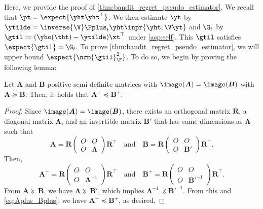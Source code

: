 Here, we provide the proof of \cref{thm:bandit_regret_pseudo_estimator}.
We recall that $\pt=\expect{\yht\yht^\top}$.
We then estimate $\yt$ by $\ytilde=\inverse{\V}\Pplus_t\yht\inpr{\yht,\V\yt}$
and $\G_t$ by $\gtil\coloneqq(\yho(\tht)-\ytilde)\xt^\top$ under \cref{asp:self}.
This $\gtil$ satisfies 
$
    \expect{\gtil}=\G_t. 
$
To prove \cref{thm:bandit_regret_pseudo_estimator}, we will upper bound $\expect{\nrm{\gtil}_\F^2}$.
To do so, we begin by proving the following lemma:
\begin{lemma}\label{lem:pseudo_inverse_order}
    Let $\bm{A}$ and $\bm{B}$ positive semi-definite matrices with $\image(\bm{A}) = \image(\bm{B})$ with $\bm{A} \succeq \bm{B}$.
    Then, it holds that $\bm{A}^+ \preceq \bm{B}^+$.
\end{lemma}
\begin{proof}
Since $\image(\bm{A}) = \image(\bm{B})$, there exists an orthogonal matrix $\bm{R}$, a diagonal matrix $\bm{\Lambda}$, and an invertible matrix $\bm{B}'$ that has same dimensions as $\bm{\Lambda}$ such that 
\begin{equation}
    \bm{A}
    =
    \bm{R}
    \begin{pmatrix}
        O & O \\
        O & \bm{\Lambda} 
    \end{pmatrix}
    \bm{R}^\top
    \quad 
    \mbox{and}
    \quad
    \bm{B}
    =
    \bm{R}
    \begin{pmatrix}
        O & O \\
        O & \bm{B}'
    \end{pmatrix}
    \bm{R}^\top
    .
    \nonumber
\end{equation}
Then, 
\begin{equation}\label{eq:Aplus_Bplus}
    \bm{A}^+
    =
    \bm{R}
    \begin{pmatrix}
        O & O \\
        O & \bm{\Lambda}^{-1}
    \end{pmatrix}
    \bm{R}^\top
    \quad 
    \mbox{and}
    \quad
    \bm{B}^+
    =
    \bm{R}
    \begin{pmatrix}
        O & O \\
        O & {\bm{B}'}^{-1}
    \end{pmatrix}
    \bm{R}^\top
    .
\end{equation}
From $\bm{A} \succeq \bm{B}$,
we have $\bm{\Lambda} \succeq \bm{B}'$, which implies $\bm{\Lambda}^{-1} \preceq {\bm{B}'}^{-1}$.
From this and \eqref{eq:Aplus_Bplus}, we have $\bm{A}^+ \preceq \bm{B}^+$, as desired.
\end{proof}

